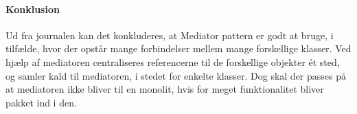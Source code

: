 \paragraph{Konklusion}
Ud fra journalen kan det konkluderes, at Mediator pattern er godt at bruge, i tilfælde, hvor der opstår mange forbindelser mellem mange forskellige klasser. Ved hjælp af mediatoren centraliseres referencerne til de forskellige objekter ét sted, og samler kald til mediatoren, i stedet for enkelte klasser. Dog skal der passes på at mediatoren ikke bliver til en monolit, hvis for meget funktionalitet bliver pakket ind i den.

